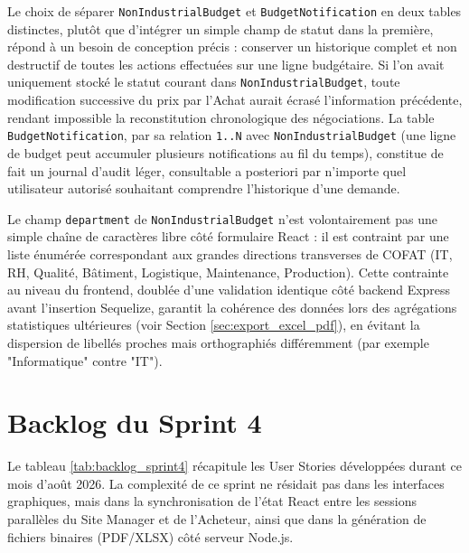 Le choix de séparer \texttt{NonIndustrialBudget} et \texttt{BudgetNotification} en deux tables distinctes, plutôt que d'intégrer un simple champ de statut dans la première, répond à un besoin de conception précis : conserver un historique complet et non destructif de toutes les actions effectuées sur une ligne budgétaire. Si l'on avait uniquement stocké le statut courant dans \texttt{NonIndustrialBudget}, toute modification successive du prix par l'Achat aurait écrasé l'information précédente, rendant impossible la reconstitution chronologique des négociations. La table \texttt{BudgetNotification}, par sa relation \texttt{1..N} avec \texttt{NonIndustrialBudget} (une ligne de budget peut accumuler plusieurs notifications au fil du temps), constitue de fait un journal d'audit léger, consultable a posteriori par n'importe quel utilisateur autorisé souhaitant comprendre l'historique d'une demande.

Le champ \texttt{department} de \texttt{NonIndustrialBudget} n'est volontairement pas une simple chaîne de caractères libre côté formulaire React : il est contraint par une liste énumérée correspondant aux grandes directions transverses de COFAT (IT, RH, Qualité, Bâtiment, Logistique, Maintenance, Production). Cette contrainte au niveau du frontend, doublée d'une validation identique côté backend Express avant l'insertion Sequelize, garantit la cohérence des données lors des agrégations statistiques ultérieures (voir Section \ref{sec:export_excel_pdf}), en évitant la dispersion de libellés proches mais orthographiés différemment (par exemple "Informatique" contre "IT").

\section{Backlog du Sprint 4}
Le tableau \ref{tab:backlog_sprint4} récapitule les User Stories développées durant ce mois d'août 2026. La complexité de ce sprint ne résidait pas dans les interfaces graphiques, mais dans la synchronisation de l'état React entre les sessions parallèles du Site Manager et de l'Acheteur, ainsi que dans la génération de fichiers binaires (PDF/XLSX) côté serveur Node.js.

